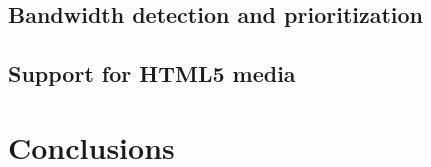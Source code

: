 \documentclass[letterpaper,twocolumn,10pt]{article}
\begin{document}

\subsection{Bandwidth detection and prioritization}


\subsection{Support for HTML5 media}




\section{Conclusions}



{\footnotesize 
}
\end{document}
